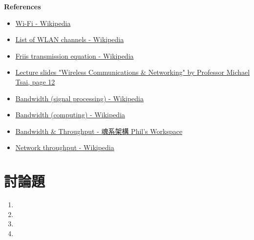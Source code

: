 \documentclass[12pt, a4paper]{article}
\begin{document}
  \textbf{References}
  \begin{footnotesize}
    \begin{itemize}
      \item \href{https://en.wikipedia.org/wiki/Wi-Fi}{Wi-Fi - Wikipedia}
      \item \href{https://en.wikipedia.org/wiki/List_of_WLAN_channels}{List of WLAN channels - Wikipedia}
      \item \href{https://en.wikipedia.org/wiki/Friis_transmission_equation}{Friis transmission equation - Wikipedia}
      \item \href{https://cool.ntu.edu.tw/courses/33591/files/5577514}{Lecture slides "Wireless Communications \& Networking" by Professor Michael Tsai, page 12}
      \item \href{https://en.wikipedia.org/wiki/Bandwidth_(signal_processing)}{Bandwidth (signal processing) - Wikipedia}
      \item \href{https://en.wikipedia.org/wiki/Bandwidth_(computing)}{Bandwidth (computing) - Wikipedia}
      \item \href{https://blog.pichuang.com.tw/20190527-bandwidth-and-throughput.html}{Bandwidth \& Throughput - 魂系架構 Phil's Workspace}
      \item \href{https://en.wikipedia.org/wiki/Network_throughput}{Network throughput - Wikipedia}
    \end{itemize}
  \end{footnotesize}

  \section{討論題}
  \begin{enumerate}[label=(\alph*)]
   \item
   \item
   \item
   \item
  \end{enumerate}
\end{document}
